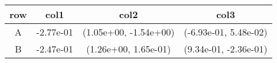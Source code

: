 \begin{tabular}{cccc}
\toprule
row&col1&col2&col3\tabularnewline
\midrule
A&-2.77e-01& (1.05e+00, -1.54e+00)& (-6.93e-01, 5.48e-02)\tabularnewline
B&-2.47e-01& (1.26e+00, 1.65e-01)& (9.34e-01, -2.36e-01)\tabularnewline
\bottomrule
\end{tabular}
